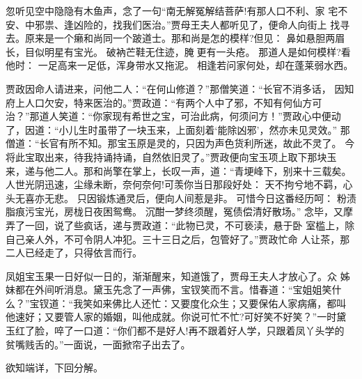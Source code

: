 忽听见空中隐隐有木鱼声，念了一句“南无解冤解结菩萨!有那人口不利、家
宅不安、中邪祟、逢凶险的，找我们医治。”贾母王夫人都听见了，便命人向街上
找寻去。原来是一个癞和尚同一个跛道士。那和尚是怎的模样?但见：
鼻如悬胆两眉长，目似明星有宝光。
破衲芒鞋无住迹，腌更有一头疮。
那道人是如何模样?看他时：
一足高来一足低，浑身带水又拖泥。
相逢若问家何处，却在蓬莱弱水西。

贾政因命人请进来，问他二人：“在何山修道？”那僧笑道：“长官不消多话，
因知府上人口欠安，特来医治的。”贾政道：“有两个人中了邪，不知有何仙方可
治？”那道人笑道：“你家现有希世之宝，可治此病，何须问方！”贾政心中便动
了，因道：“小儿生时虽带了一块玉来，上面刻着‘能除凶邪’，然亦未见灵效。”
那僧道：“长官有所不知。那宝玉原是灵的，只因为声色货利所迷，故此不灵了。
今将此宝取出来，待我持诵持诵，自然依旧灵了。”贾政便向宝玉项上取下那块玉
来，递与他二人。那和尚擎在掌上，长叹一声，道：“青埂峰下，别来十三载矣。
人世光阴迅速，尘缘未断，奈何奈何!可羡你当日那段好处：
天不拘兮地不羁，心头无喜亦无悲。
只因锻炼通灵后，便向人间惹是非。
可惜今日这番经历呵：
粉渍脂痕污宝光，房栊日夜困鸳鸯。
沉酣一梦终须醒，冤债偿清好散场。”
念毕，又摩弄了一回，说了些疯话，递与贾政道：“此物已灵，不可亵渎，悬于卧
室槛上，除自己亲人外，不可令阴人冲犯。三十三日之后，包管好了。”贾政忙命
人让茶，那二人已经走了，只得依言而行。

凤姐宝玉果一日好似一日的，渐渐醒来，知道饿了，贾母王夫人才放心了。众
姊妹都在外间听消息。黛玉先念了一声佛，宝钗笑而不言。惜春道：“宝姐姐笑什
么？”宝钗道：“我笑如来佛比人还忙：又要度化众生；又要保佑人家病痛，都叫
他速好；又要管人家的婚姻，叫他成就。你说可忙不忙?可好笑不好笑？”一时黛
玉红了脸，啐了一口道：“你们都不是好人!再不跟着好人学，只跟着凤丫头学的
贫嘴贱舌的。”一面说，一面掀帘子出去了。

欲知端详，下回分解。